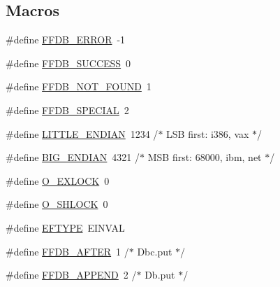 \subsection*{Macros}
\begin{DoxyCompactItemize}
\item 
\#define \mbox{\hyperlink{adat-devel_2other__libs_2filedb_2filehash_2ffdb__db_8h_a6f45e403c9d0f208102c48494c1c8456}{F\+F\+D\+B\+\_\+\+E\+R\+R\+OR}}~-\/1
\item 
\#define \mbox{\hyperlink{adat-devel_2other__libs_2filedb_2filehash_2ffdb__db_8h_a7a0fe02169bd038c9302314839c266b9}{F\+F\+D\+B\+\_\+\+S\+U\+C\+C\+E\+SS}}~0
\item 
\#define \mbox{\hyperlink{adat-devel_2other__libs_2filedb_2filehash_2ffdb__db_8h_a0466c0ffa7df6652287d69c6197969b4}{F\+F\+D\+B\+\_\+\+N\+O\+T\+\_\+\+F\+O\+U\+ND}}~1
\item 
\#define \mbox{\hyperlink{adat-devel_2other__libs_2filedb_2filehash_2ffdb__db_8h_a5da36dd89af64bd7798494ddd4cd5458}{F\+F\+D\+B\+\_\+\+S\+P\+E\+C\+I\+AL}}~2
\item 
\#define \mbox{\hyperlink{adat-devel_2other__libs_2filedb_2filehash_2ffdb__db_8h_a8782a401fbf55261460863fc2f8df1ce}{L\+I\+T\+T\+L\+E\+\_\+\+E\+N\+D\+I\+AN}}~1234		/$\ast$ L\+SB first\+: i386, vax $\ast$/
\item 
\#define \mbox{\hyperlink{adat-devel_2other__libs_2filedb_2filehash_2ffdb__db_8h_a23eb5e058a210efdde3d64e69679fafa}{B\+I\+G\+\_\+\+E\+N\+D\+I\+AN}}~4321		/$\ast$ M\+SB first\+: 68000, ibm, net $\ast$/
\item 
\#define \mbox{\hyperlink{adat-devel_2other__libs_2filedb_2filehash_2ffdb__db_8h_ad041d863b473edbd26926d2fad250384}{O\+\_\+\+E\+X\+L\+O\+CK}}~0
\item 
\#define \mbox{\hyperlink{adat-devel_2other__libs_2filedb_2filehash_2ffdb__db_8h_a8234597f4e8a183770c5f5d94ba8562a}{O\+\_\+\+S\+H\+L\+O\+CK}}~0
\item 
\#define \mbox{\hyperlink{adat-devel_2other__libs_2filedb_2filehash_2ffdb__db_8h_a940ffe53c91c0b90f8188122ea1bdbf0}{E\+F\+T\+Y\+PE}}~E\+I\+N\+V\+AL
\item 
\#define \mbox{\hyperlink{adat-devel_2other__libs_2filedb_2filehash_2ffdb__db_8h_adeaff3f2cb350af4589d2f248730e0a8}{F\+F\+D\+B\+\_\+\+A\+F\+T\+ER}}~1	/$\ast$ Dbc.\+put $\ast$/
\item 
\#define \mbox{\hyperlink{adat-devel_2other__libs_2filedb_2filehash_2ffdb__db_8h_accac2874fe248090172ac79268f8815f}{F\+F\+D\+B\+\_\+\+A\+P\+P\+E\+ND}}~2	/$\ast$ Db.\+put $\ast$/
\item 

\end{DoxyCompactItemize}
